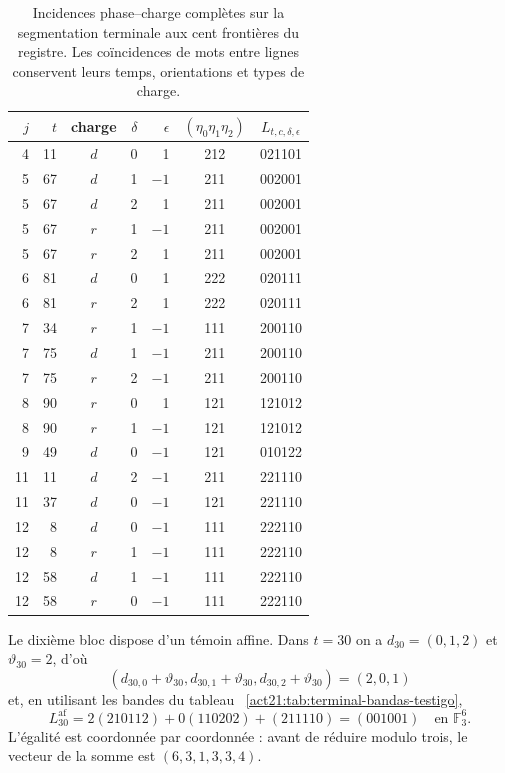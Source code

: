 \begin{table}[htbp]
\centering\small
\begin{tabular}{rrcrrc c}
\toprule
$j$&$t$&charge&$\delta$&$\epsilon$&$(\eta_0\eta_1\eta_2)$&$L_{t,c,\delta,\epsilon}$\\
\midrule
4&11&$d$&0& 1&212&021101\\
5&67&$d$&1&$-1$&211&002001\\
5&67&$d$&2& 1&211&002001\\
5&67&$r$&1&$-1$&211&002001\\
5&67&$r$&2& 1&211&002001\\
6&81&$d$&0& 1&222&020111\\
6&81&$r$&2& 1&222&020111\\
7&34&$r$&1&$-1$&111&200110\\
7&75&$d$&1&$-1$&211&200110\\
7&75&$r$&2&$-1$&211&200110\\
8&90&$r$&0& 1&121&121012\\
8&90&$r$&1&$-1$&121&121012\\
9&49&$d$&0&$-1$&121&010122\\
11&11&$d$&2&$-1$&211&221110\\
11&37&$d$&0&$-1$&121&221110\\
12&8&$d$&0&$-1$&111&222110\\
12&8&$r$&1&$-1$&111&222110\\
12&58&$d$&1&$-1$&111&222110\\
12&58&$r$&0&$-1$&111&222110\\
\bottomrule
\end{tabular}
\caption{Incidences phase--charge complètes sur la segmentation terminale  
aux cent frontières du registre. Les coïncidences de mots entre  
lignes conservent leurs temps, orientations et types de charge.}
\label{act21:tab:terminal-incidencias-completas}
\end{table}

Le dixième bloc dispose d'un témoin affine. Dans $t=30$ on a
$d_{30}=(0,1,2)$ et $\vartheta_{30}=2$, d'où
\[
 (d_{30,0}+\vartheta_{30},d_{30,1}+\vartheta_{30},
 d_{30,2}+\vartheta_{30})=(2,0,1)
\]
et, en utilisant les bandes du tableau ~\ref{act21:tab:terminal-bandas-testigo},
\[
 L^{\mathrm{af}}_{30}
 =2(210112)+0(110202)+(211110)
 =(001001)\quad\text{en }\mathbb F_3^6.
\]
L'égalité est coordonnée par coordonnée : avant de réduire modulo trois,  
le vecteur de la somme est $(6,3,1,3,3,4)$.

